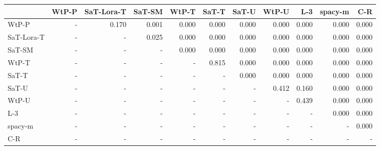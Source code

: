 \begin{tabular}{lrrrrrrrrrr}
\toprule
 & WtP-P & SaT-Lora-T & SaT-SM & WtP-T & SaT-T & SaT-U & WtP-U & L-3 & spacy-m & C-R \\
\midrule
WtP-P & - & 0.170 & 0.001 & 0.000 & 0.000 & 0.000 & 0.000 & 0.000 & 0.000 & 0.000 \\
SaT-Lora-T & - & - & 0.025 & 0.000 & 0.000 & 0.000 & 0.000 & 0.000 & 0.000 & 0.000 \\
SaT-SM & - & - & - & 0.000 & 0.000 & 0.000 & 0.000 & 0.000 & 0.000 & 0.000 \\
WtP-T & - & - & - & - & 0.815 & 0.000 & 0.000 & 0.000 & 0.000 & 0.000 \\
SaT-T & - & - & - & - & - & 0.000 & 0.000 & 0.000 & 0.000 & 0.000 \\
SaT-U & - & - & - & - & - & - & 0.412 & 0.160 & 0.000 & 0.000 \\
WtP-U & - & - & - & - & - & - & - & 0.439 & 0.000 & 0.000 \\
L-3 & - & - & - & - & - & - & - & - & 0.000 & 0.000 \\
spacy-m & - & - & - & - & - & - & - & - & - & 0.000 \\
C-R & - & - & - & - & - & - & - & - & - & - \\
\bottomrule
\end{tabular}

